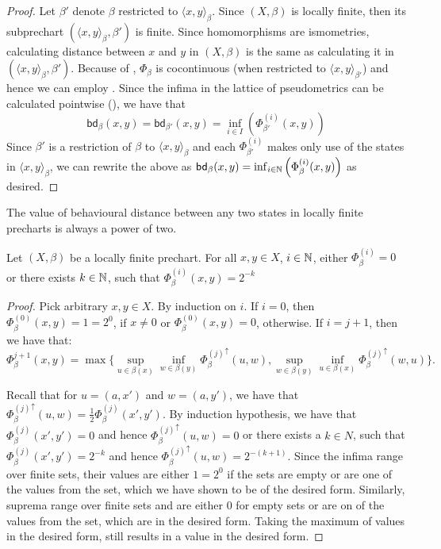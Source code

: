 \begin{proof}
Let $\beta'$ denote $\beta$ restricted to $\langle x , y \rangle_\beta$.
	Since $(X, \beta)$ is locally finite, then its subprechart $(\langle x , y \rangle_\beta, \beta')$ is finite. Since homomorphisms are ismometries, calculating distance between $x$ and $y$ in $(X, \beta)$ is the same as calculating it in $(\langle x , y \rangle_\beta, \beta')$. Because of , $\Phi_\beta$ is cocontinuous (when restricted to $\langle x , y \rangle_{\beta'}$) and hence we can employ . Since the infima in the lattice of pseudometrics can be calculated pointwise (), we have that
	$$
	\mathsf{bd}_\beta(x,y) = \mathsf{bd}_{\beta'}(x,y) = \inf_{i \in I} \left( \Phi^{(i)}_{\beta'}(x,y)\right)
	$$
	Since $\beta'$ is a restriction of $\beta$ to ${\langle x , y \rangle_\beta}$ and each $\Phi^{(i)}_{\beta'}$ makes only use of the states in $\langle x , y \rangle_\beta$, we can rewrite the above as $
	\mathsf{bd}_\beta(x,y) = \inf_{i \in \mathbb{N}} \left(\Phi_\beta^{(i)}(x,y)\right)
	$ as desired.
\end{proof} 
The value of behavioural distance between any two states in locally finite precharts is always a power of two.
\begin{lemma}\label{lem:distance_power_of_two}
	Let $(X,\beta)$ be a locally finite prechart. For all $x,y \in X$, $i \in \mathbb{N}$, either $\Phi_\beta^{(i)}=0$ or there exists $k \in \mathbb{N}$, such that $\Phi_{\beta}^{(i)}(x,y)=2^{-k}$
\end{lemma}
\begin{proof}
	Pick arbitrary $x,y \in X$.
	By induction on $i$. If $i = 0$, then $\Phi^{(0)}_\beta(x,y)=1=2^{0}$, if $x \neq 0$ or $\Phi^{(0)}_\beta(x,y)=0$, otherwise. 
	If $i = j + 1$, then we have that:
	$$
	\Phi^{j + 1}_\beta(x,y) = \max \{\sup_{u \in \beta(x)} \inf_{w \in \beta(y)} {\Phi^{(j)}_\beta}^\uparrow(u,w), \sup_{w \in \beta(y)} \inf_{u \in \beta(x)}{\Phi^{(j)}_\beta}^\uparrow(w,u)\}.
	$$
	
	Recall that for $u = (a,x')$ and $w=(a,y')$, we have that ${\Phi^{(j)}_\beta}^\uparrow(u,w)=\frac{1}{2} {\Phi^{(j)}_\beta}(x',y')$. By induction hypothesis, we have that ${\Phi^{(j)}_\beta}(x',y')=0$ and hence ${\Phi^{(j)}_\beta}^\uparrow(u,w)=0$ or there exists a $k \in N$, such that ${\Phi^{(j)}_\beta}(x',y')=2^{-k}$ and hence ${\Phi^{(j)}_\beta}^\uparrow(u,w)=2^{-(k+1)}$. Since the infima range over finite sets, their values are either $1=2^0$ if the sets are empty or are one of the values from the set, which we have shown to be of the desired form. Similarly, suprema range over finite sets and are either $0$ for empty sets or are on of the values from the set, which are in the desired form. Taking the maximum of values in the desired form, still results in a value in the desired form.
\end{proof}
